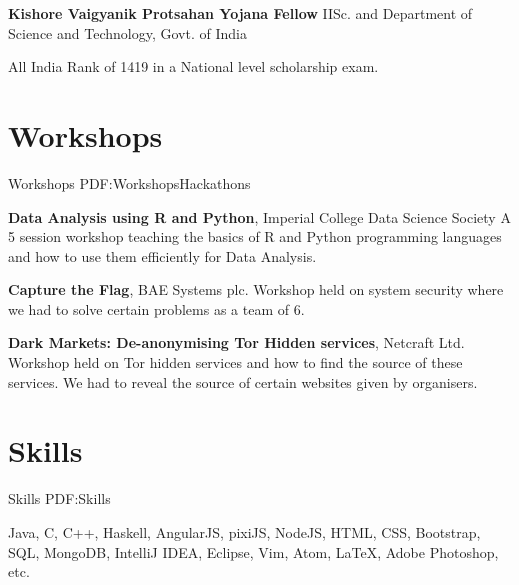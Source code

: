 \documentclass[letterpaper,10pt,oneside]{article}
\begin{document}
\begin{body}
\GapNoBreak

\BulletItem
\textbf{Kishore Vaigyanik Protsahan Yojana Fellow}
\hfill
{}
\newline
IISc. and Department of Science and Technology, Govt. of India
\begin{detail}
\SubItem
All India Rank of 1419 in a National level scholarship exam.
\end{detail}



\section
{Workshops}
{Workshops}
{PDF:WorkshopsHackathons}

\BulletItem
\textbf{Data Analysis using R and Python},
\hfill
{}
\newline
Imperial College Data Science Society
\newline
A 5 session workshop teaching the basics of R and Python programming languages
and how to use them efficiently for Data Analysis.
\GapNoBreak

\BulletItem
\textbf{Capture the Flag},
\hfill
{}
\newline
BAE Systems plc.
\newline
Workshop held on system security where we had to solve certain problems as a
team of 6.

\GapNoBreak

\BulletItem
\textbf{Dark Markets: De-anonymising Tor Hidden services},
\hfill
{}
\newline
Netcraft Ltd.
\newline
Workshop held on Tor hidden services and how to find the source of these
services. We had to reveal the source of certain websites given by organisers.


\section
{Skills}
{Skills}
{PDF:Skills}

Java,
C,
C++,
Haskell,
\newline
AngularJS,
pixiJS,
NodeJS,
HTML,
CSS,
Bootstrap,
SQL,
MongoDB,
\newline
IntelliJ IDEA,
Eclipse,
Vim,
Atom,
\newline
{\LaTeX},
Adobe Photoshop, etc.


\end{body}
\end{document}
